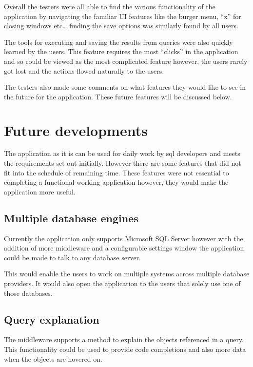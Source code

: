 Overall the testers were all able to find the various functionality of
the application by navigating the familiar UI features like the burger
menu, ``x'' for closing windows etc\ldots{} finding the save options was
similarly found by all users.

The tools for executing and saving the results from queries were also
quickly learned by the users. This feature requires the most ``clicks''
in the application and so could be viewed as the most complicated
feature however, the users rarely got lost and the actions flowed
naturally to the users.

The testers also made some comments on what features they would like to
see in the future for the application. These future features will be
discussed below.

\section{Future developments}\label{future-developments}

The application as it is can be used for daily work by sql developers
and meets the requirements set out initially. However there are some
features that did not fit into the schedule of remaining time. These
features were not essential to completing a functional working
application however, they would make the application more useful.

\subsection{Multiple database
engines}\label{multiple-database-engines}

Currently the application only supports Microsoft SQL Server however
with the addition of more middleware and a configurable settings window
the application could be made to talk to any database server.

This would enable the users to work on multiple systems across multiple
database providers. It would also open the application to the users that
solely use one of those databases.

\subsection{Query explanation}\label{query-explanation}

The middleware supports a method to explain the objects referenced in a
query. This functionality could be used to provide code completions and
also more data when the objects are hovered on.

